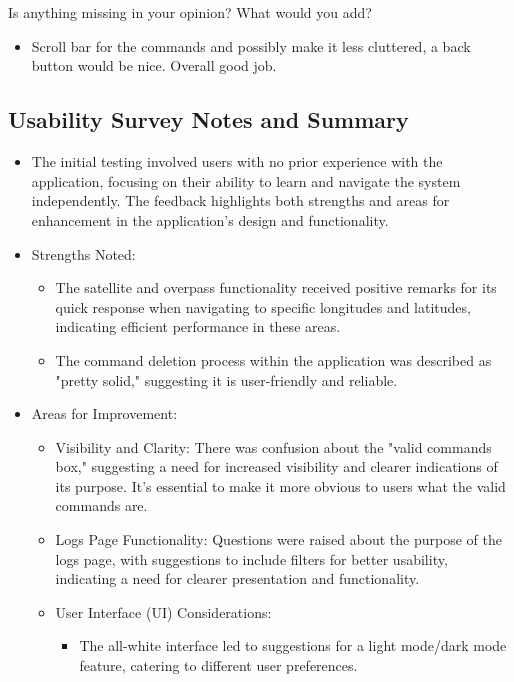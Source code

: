 \documentclass[12pt, titlepage]{article}
\begin{document}
\\ \\

Is anything missing in your opinion? What would you add? 

\begin{itemize}
    \item Scroll bar for the commands and possibly make it less cluttered, a back button would be nice. Overall good job.
\end{itemize}

\subsection{Usability Survey Notes and Summary}
\begin{itemize}
    \item The initial testing involved users with no prior experience with the application, focusing on their ability to learn and navigate the system independently. The feedback highlights both strengths and areas for enhancement in the application's design and functionality.
    \item Strengths Noted:
    \begin{itemize}
        \item The satellite and overpass functionality received positive remarks for its quick response when navigating to specific longitudes and latitudes, indicating efficient performance in these areas.
        \item The command deletion process within the application was described as "pretty solid," suggesting it is user-friendly and reliable.
    \end{itemize}
    \item Areas for Improvement:
    \begin{itemize}
        \item Visibility and Clarity: There was confusion about the "valid commands box," suggesting a need for increased visibility and clearer indications of its purpose. It's essential to make it more obvious to users what the valid commands are.
        \item Logs Page Functionality: Questions were raised about the purpose of the logs page, with suggestions to include filters for better usability, indicating a need for clearer presentation and functionality.
        \item User Interface (UI) Considerations:
        \begin{itemize}
            \item The all-white interface led to suggestions for a light mode/dark mode feature, catering to different user preferences.

\end{itemize}
\end{itemize}
\end{itemize}
\end{document}
